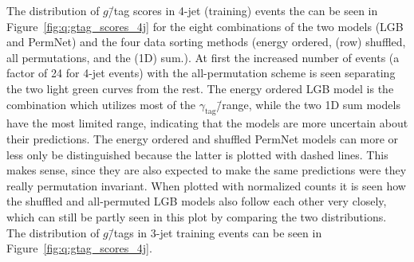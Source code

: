 The distribution of $g$\=/tag scores in 4-jet (training) events the can be seen in Figure~\ref{fig:q:gtag_scores_4j} for the eight combinations of the two models (LGB and PermNet) and the four data sorting methods (energy ordered, (row) shuffled, all permutations, and the (1D) sum.). At first the increased number of events (a factor of \num{24} for 4-jet events) with the all-permutation scheme is seen separating the two light green curves from the rest. The energy ordered LGB model is the combination which utilizes most of the $\gamma_\mathrm{tag}$\=/range, while the two 1D sum models have the most limited range, indicating that the models are more uncertain about their predictions. The energy ordered and shuffled PermNet models can more or less only be distinguished because the latter is plotted with dashed lines. This makes sense, since they are also expected to make the same predictions were they really permutation invariant. When plotted with normalized counts it is seen how the shuffled and all-permuted LGB models also follow each other very closely, which can still be partly seen in this plot by comparing the two distributions. The distribution of $g$\=/tags in 3-jet training events can be seen in Figure~\ref{fig:q:gtag_scores_4j}. 

